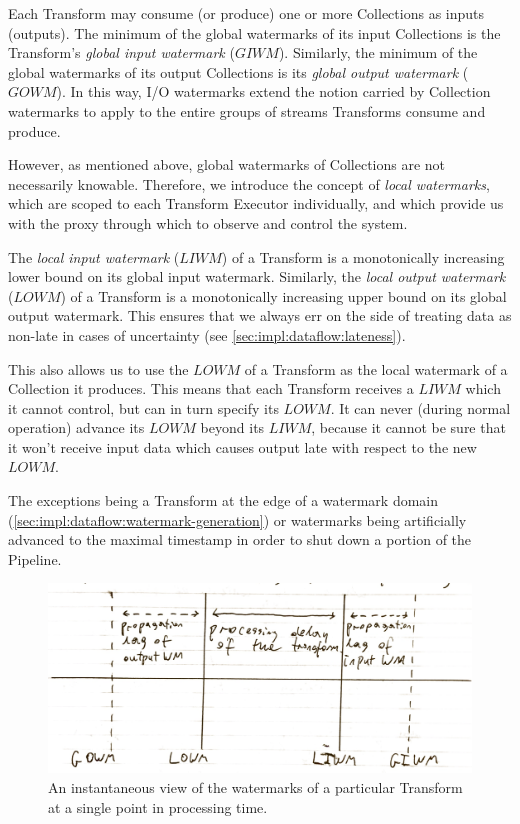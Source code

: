 Each Transform may consume (or produce) one or more Collections as inputs (outputs).
The minimum of the global watermarks of its input Collections is the Transform's \emph{global input watermark} ($\mathit{GIWM}$).
Similarly, the minimum of the global watermarks of its output Collections is its \emph{global output watermark} ($\mathit{GOWM}$).
In this way, I/O watermarks extend the notion carried by Collection watermarks to apply to the entire groups of streams Transforms consume and produce.

However, as mentioned above, global watermarks of Collections are not necessarily knowable.
Therefore, we introduce the concept of \emph{local watermarks}, which are scoped to each Transform Executor individually, and which provide us with the proxy through which to observe and control the system.

The \emph{local input watermark} ($\mathit{LIWM}$) of a Transform is a monotonically increasing lower bound on its global input watermark.
Similarly, the \emph{local output watermark} ($\mathit{LOWM}$) of a Transform is a monotonically increasing upper bound on its global output watermark.
This ensures that we always err on the side of treating data as non-late in cases of uncertainty (see \cref{sec:impl:dataflow:lateness}).

This also allows us to use the $\mathit{LOWM}$ of a Transform as the local watermark of a Collection it produces.
This means that each Transform receives a $\mathit{LIWM}$ which it cannot control, but can in turn specify its $\mathit{LOWM}$.
It can never (during normal operation\footnotemark) advance its $\mathit{LOWM}$ beyond its $\mathit{LIWM}$, because it cannot be sure that it won't receive input data which causes output late with respect to the new $\mathit{LOWM}$.

\footnotetext
{
The exceptions being a Transform at the edge of a watermark domain (\cref{sec:impl:dataflow:watermark-generation}) or watermarks being artificially advanced to the maximal timestamp in order to shut down a portion of the Pipeline.
} 

\begin{figure}[t]
	\includegraphics[width=\textwidth]{images/temp/lwm-transform-instantaneous}
	\caption{An instantaneous view of the watermarks of a particular Transform at a single point in processing time.}
	\label{fig:impl:lwm-instantaneous}
\end{figure}

